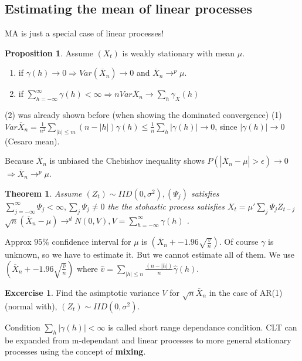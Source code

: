 \documentclass[12pt,a4paper]{amsart}
\theoremstyle{definition} %
\newtheorem{excercise}[defn]{Excercise}
\newtheorem{proposition}[defn]{Proposition}
\theoremstyle{plain} %
\newtheorem{theorem}[defn]{Theorem}
\begin{document}
\subsection{Estimating the mean of linear processes}

MA is just a special case of linear processes! 

\begin{proposition}
Assume $(X_t)$ is weakly stationary with mean $\mu$.
\begin{enumerate}
\item if $\gamma(h) \rightarrow 0 \Rightarrow Var(\overline{X}_n) \rightarrow 0$ and $\overline{X}_n \rightarrow^p \mu$.
\item if $\sum_{h = -\infty}^\infty\gamma(h) < \infty \Rightarrow n Var \overline{X}_n \rightarrow \sum_h \gamma_X(h)$
\end{enumerate}
\end{proposition}
\proof
(2) was already shown before (when showing the dominated convergence)
(1) $Var \overline{X}_n = \frac{1}{n^2} \sum_{|h| \leq m} (n - |h|)\gamma(h) \leq \frac{1}{n} \sum_h |\gamma(h)| \rightarrow 0$, since $|\gamma(h)| \rightarrow 0$ (Cesaro mean). 

Because $\overline{X}_n$ is unbiased the Chebishov inequality shows $P(|\overline{X}_n - \mu| > \epsilon) \rightarrow 0$
$\Rightarrow \overline{X}_n \rightarrow^p \mu$.
\endproof

\begin{theorem}
Assume $(Z_t) \sim IID(0, \sigma^2), (\Psi_j)$ satisfies $\sum_{j = -\infty}^\infty \Psi_j< \infty, \sum_j \Psi_j \neq 0$ the the stohastic process satisfies $X_t = \mu ' \sum_j \Psi_j Z_{t-j}$
$\sqrt{n}(\overline{X}_n - \mu) \rightarrow^d N(0, V), V = \sum_{h=-\infty}^\infty \gamma(h)$ .
\end{theorem}

Approx $95\%$ confidence interval for $\mu$ is $(\overline{X}_n +- 1.96 \sqrt{\frac{v}{n}})$. Of course $\gamma$ is unknown, so we have to estimate it. But we cannot estimate all of them. We use $(\overline{X}_n +- 1.96 \sqrt{\frac{\hat{v}}{n}})$ where $\hat{v} = \sum_{|h| \leq n} \frac{(n - |h|)}{n}\hat{\gamma}(h)$.


\begin{excercise}
Find the asimptotic variance $V$ for $\sqrt{n} \overline{X}_n$ in the case of AR(1) (normal with), $(Z_t) \sim IID(0, \sigma^2)$.
\end{excercise}

Condition $\sum_h |\gamma(h)| < \infty$ is called short range dependance condition. CLT can be expanded from m-dependant and linear processes to more general stationary processes using the concept of {\bf mixing}. 
\end{document}
